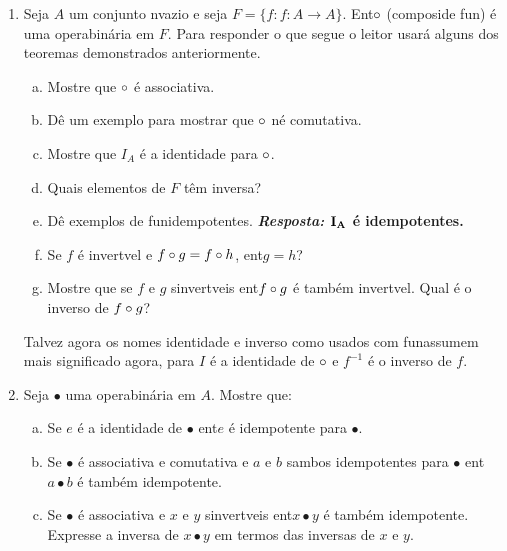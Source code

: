 \begin{enumerate}[{\bf 1.}]
\begin{enumerate}[a)]
{\bf{\it Resposta:} Resposta parcial - Suponha que ${\bf f}$ seja injetora. Sejam ${\bf C,D\in\mathbb{P}(A)}$ com ${\bf f^{\ast}(C)=f^{\ast}(D)}$. Suponha $C\neq D$. Ent\aoi, existe ${\bf x\in C}$ tal que ${\bf x\notin D}$. Mas ${\bf f(x)\in f^{\ast}(C)=f^{\ast}(D)}$ assim dever\'a existir ${\bf y\neq x}$ pertencente ${\bf D}$ tal que ${\bf f(y)=f(x)}$. Mas isto contradiz a hip\'otese que ${\bf f}$ era injetora.}

\item Mostre que $f$ sobrejetora se e somente se $f^{\ast}$ sobrejetora.
\item Quando $(f^{-1})^{\ast}=(f^{\ast})^{-1}$?  
\end{enumerate}

\item Seja $A$ um conjunto n\ao vazio e seja $F=\{f: f:A\to A\}$. Ent\ao $\circ$ (composi\cao de fun\caoi) \'e uma opera\cao bin\'aria em $F$. Para responder o que segue o leitor usar\'a alguns dos teoremas demonstrados anteriormente.
\begin{enumerate}[a)]
\item Mostre que $\circ$ \'e associativa. 
\item D\^e um exemplo para mostrar que $\circ$ n\ao \'e comutativa.
\item Mostre que $I_A$ \'e a identidade para $\circ$.
\item Quais elementos de $F$ t\^em inversa?
\item D\^e exemplos de fun\coes idempotentes. {\bf{\it Resposta:} ${\bf I_A}$ \'e idempotentes.}
\item Se $f$ \'e invert\ih vel e $f\circ g=f\circ h$, ent\ao $g=h$?
\item Mostre que se $f$ e $g$ s\ao invert\ih veis ent\ao $f\circ g$ \'e tamb\'em invert\ih vel. Qual \'e o inverso de $f\circ g$?
\end{enumerate}

Talvez agora os nomes identidade e inverso como usados com fun\coes assumem mais significado agora, para $I$ \'e a identidade de $\circ$ e $f^{-1}$ \'e o inverso de $f$.

\item Seja $\bullet$ uma opera\cao bin\'aria em $A$. Mostre que:
\begin{enumerate}[a)]
\item Se $e$ \'e a identidade de $\bullet$ ent\ao $e$ \'e idempotente para $\bullet$.
\item Se $\bullet$ \'e associativa e comutativa e $a$ e $b$ s\ao ambos idempotentes para $\bullet$ ent\ao $a\bullet b$ \'e tamb\'em idempotente.
\item Se $\bullet$ \'e associativa e $x$ e $y$ s\ao invert\ih veis ent\ao $x\bullet y$ \'e tamb\'em idempotente. Expresse a inversa de $x\bullet y$ em termos das inversas de $x$ e $y$.


\end{enumerate}
\end{enumerate}
